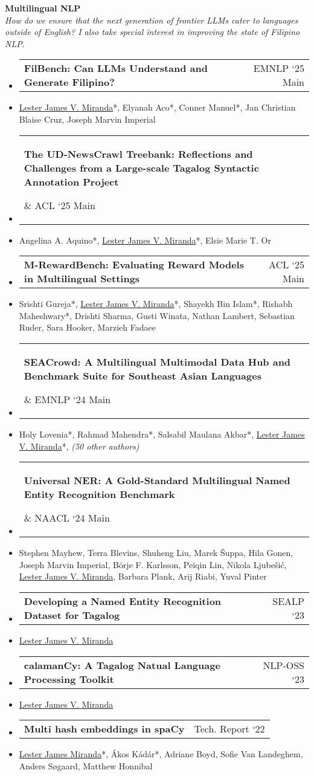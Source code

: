 \documentclass[a4paper,11pt]{article}
\makeatletter
\newcommand{\resumeItem}[1]{
  \item\small{
    {#1 \vspace{-2pt}}
  }
}
\newcommand{\resumeProjectHeading}[2]{
    \item
    \begin{tabular*}{0.97\textwidth}{l@{\extracolsep{\fill}}r}
      \small#1 & #2 \\
    \end{tabular*}\vspace{-7pt}
}
\newcommand{\resumeSubHeadingListStart}{\begin{itemize}[leftmargin=0.15in, label={}]}
\newcommand{\resumeSubHeadingListEnd}{\end{itemize}}
\makeatother
\begin{document}
\vspace{0.1em}
\textbf{Multilingual NLP}\\
\textit{How do we ensure that the next generation of frontier LLMs cater to languages outside of English? I also take special interest in improving the state of Filipino NLP.}
\resumeSubHeadingListStart
\resumeProjectHeading
{\textbf{FilBench: Can LLMs Understand and Generate Filipino?}}{\small EMNLP `25 Main}
\resumeItem{\underline{Lester James V. Miranda}*, Elyanah Aco*, Conner Manuel*, Jan Christian Blaise Cruz, Joseph Marvin Imperial}
\resumeProjectHeading
{\parbox{0.80\textwidth}{\textbf{The UD-NewsCrawl Treebank: Reflections and Challenges from a Large-scale Tagalog Syntactic Annotation Project}}}{\small ACL `25 Main}
\resumeItem{Angelina A. Aquino*, \underline{Lester James V. Miranda}*, Elsie Marie T. Or}
\resumeProjectHeading
{\textbf{M-RewardBench: Evaluating Reward Models in Multilingual Settings}}{\small ACL `25 Main}
\resumeItem{Srishti Gureja*, \underline{Lester James V. Miranda}*, Shayekh Bin Islam*, Rishabh Maheshwary*, Drishti Sharma, Gusti Winata, Nathan Lambert, Sebastian Ruder, Sara Hooker, Marzieh Fadaee}
\resumeProjectHeading
{\parbox{0.80\textwidth}{\textbf{SEACrowd: A Multilingual Multimodal Data Hub and Benchmark Suite for Southeast Asian Languages}}}{\small EMNLP `24 Main}
\resumeItem{Holy Lovenia*, Rahmad Mahendra*, Salsabil Maulana Akbar*, \underline{Lester James V. Miranda}*, \textit{(50 other authors)}}
\resumeProjectHeading
{\parbox{0.70\textwidth}{\textbf{Universal NER: A Gold-Standard Multilingual Named Entity Recognition Benchmark}}}{\small NAACL `24 Main}
\resumeItem{Stephen Mayhew, Terra Blevins, Shuheng Liu, Marek Šuppa, Hila Gonen, Joseph Marvin Imperial, Börje F. Karlsson, Peiqin Lin, Nikola Ljubešić, \underline{Lester James V. Miranda}, Barbara Plank, Arij Riabi, Yuval Pinter}
\resumeProjectHeading
{\textbf{Developing a Named Entity Recognition Dataset for Tagalog}}{\small SEALP `23}
\resumeItem{\underline{Lester James V. Miranda}}
\resumeProjectHeading
{\textbf{calamanCy: A Tagalog Natual Language Processing Toolkit}}{\small NLP-OSS `23}
\resumeItem{\underline{Lester James V. Miranda}}
\resumeProjectHeading
{\textbf{Multi hash embeddings in spaCy}}{\small Tech. Report `22}
\resumeItem{\underline{Lester James Miranda}*, Ákos Kádár*, Adriane Boyd, Sofie Van Landeghem, Anders Søgaard, Matthew Honnibal}
\resumeSubHeadingListEnd

\end{document}
